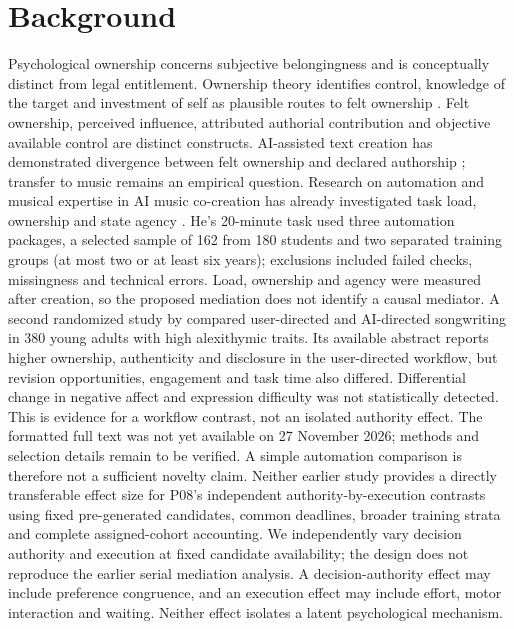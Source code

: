 \documentclass[11pt]{article}
\begin{document}
\section{Background}
Psychological ownership concerns subjective belongingness and is conceptually distinct from legal entitlement. Ownership theory identifies control, knowledge of the target and investment of self as plausible routes to felt ownership \citep{pierce2001,pierce2003}. Felt ownership, perceived influence, attributed authorial contribution and objective available control are distinct constructs. AI-assisted text creation has demonstrated divergence between felt ownership and declared authorship \citep{draxler2024}; transfer to music remains an empirical question. Research on automation and musical expertise in AI music co-creation has already investigated task load, ownership and state agency \citep{he2026}. He's 20-minute task used three automation packages, a selected sample of 162 from 180 students and two separated training groups (at most two or at least six years); exclusions included failed checks, missingness and technical errors. Load, ownership and agency were measured after creation, so the proposed mediation does not identify a causal mediator. A second randomized study by \citet{zhang2026workflow} compared user-directed and AI-directed songwriting in 380 young adults with high alexithymic traits. Its available abstract reports higher ownership, authenticity and disclosure in the user-directed workflow, but revision opportunities, engagement and task time also differed. Differential change in negative affect and expression difficulty was not statistically detected. This is evidence for a workflow contrast, not an isolated authority effect. The formatted full text was not yet available on 27 November 2026; methods and selection details remain to be verified. A simple automation comparison is therefore not a sufficient novelty claim. Neither earlier study provides a directly transferable effect size for P08's independent authority-by-execution contrasts using fixed pre-generated candidates, common deadlines, broader training strata and complete assigned-cohort accounting. We independently vary decision authority and execution at fixed candidate availability; the design does not reproduce the earlier serial mediation analysis. A decision-authority effect may include preference congruence, and an execution effect may include effort, motor interaction and waiting. Neither effect isolates a latent psychological mechanism.
\end{document}
